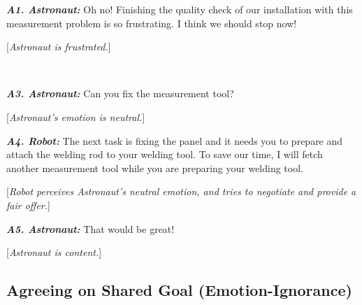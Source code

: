 \begin{spacing}{1.2}
\small{ 
\begin{description}
  \item \textit{\textbf{A1. Astronaut:}} Oh no! Finishing the quality check of
  our installation with this measurement problem is so frustrating. I think we
  should stop now!

  [\textit{Astronaut is frustrated.}]\\

  \item {}\\
  
  \item \textit{\textbf{A3. Astronaut:}} Can you fix the measurement tool?

  [\textit{Astronaut's emotion is neutral.}]\\
  
  \item \textit{\textbf{A4. Robot:}} The next task is fixing the panel and it
  needs you to prepare and attach the welding rod to your welding tool. To save
  our time, I will fetch another measurement tool while you are preparing your
  welding tool.

  [\textit{Robot perceives Astronaut's neutral emotion, and tries to negotiate
  and provide a fair offer.}]\\

  \item \textit{\textbf{A5. Astronaut:}} That would be great!
  
  [\textit{Astronaut is content.}]
  
\end{description}
}
\end{spacing}


\subsection{Agreeing on Shared Goal (Emotion-Ignorance)}
\label{sec:exp2}

